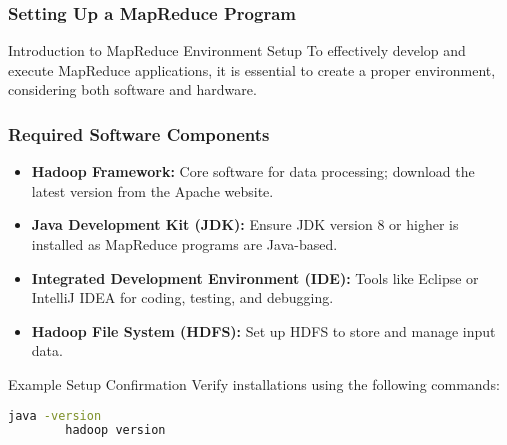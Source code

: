 \documentclass[aspectratio=169]{beamer}
\begin{document}
\begin{frame}[fragile]
    \frametitle{Setting Up a MapReduce Program}
    \begin{block}{Introduction to MapReduce Environment Setup}
        To effectively develop and execute MapReduce applications, it is essential to create a proper environment, considering both software and hardware.
    \end{block}
\end{frame}

\begin{frame}[fragile]
    \frametitle{Required Software Components}
    \begin{itemize}
        \item \textbf{Hadoop Framework:} Core software for data processing; download the latest version from the Apache website.
        \item \textbf{Java Development Kit (JDK):} Ensure JDK version 8 or higher is installed as MapReduce programs are Java-based.
        \item \textbf{Integrated Development Environment (IDE):} Tools like Eclipse or IntelliJ IDEA for coding, testing, and debugging.
        \item \textbf{Hadoop File System (HDFS):} Set up HDFS to store and manage input data.
    \end{itemize}
    \begin{block}{Example Setup Confirmation}
        Verify installations using the following commands:
        \begin{lstlisting}[language=bash]
        java -version
        hadoop version
        \end{lstlisting}
    \end{block}
\end{frame}
\end{document}
